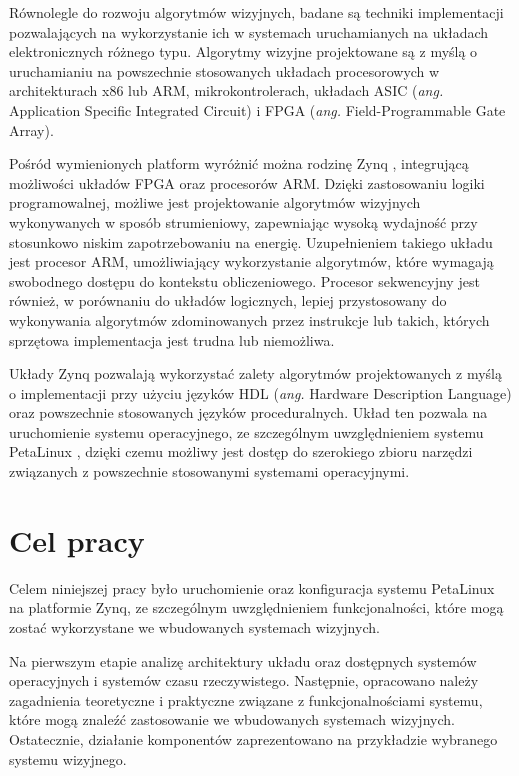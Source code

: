 Równolegle do rozwoju algorytmów wizyjnych, badane są techniki implementacji pozwalających na wykorzystanie ich w systemach uruchamianych na układach elektronicznych różnego typu. %
Algorytmy wizyjne projektowane są z myślą o uruchamianiu na powszechnie stosowanych układach procesorowych w architekturach x86 lub ARM, mikrokontrolerach, układach ASIC (\emph{ang.} Application Specific Integrated Circuit) i FPGA (\emph{ang.} Field-Programmable Gate Array). %

Pośród wymienionych platform wyróżnić można rodzinę Zynq \cite{zybo-reference-manual}, integrującą możliwości układów FPGA oraz procesorów ARM. 
Dzięki zastosowaniu logiki programowalnej, możliwe jest projektowanie algorytmów wizyjnych wykonywanych w sposób strumieniowy, zapewniając wysoką wydajność przy stosunkowo niskim zapotrzebowaniu na energię. %
Uzupełnieniem takiego układu jest procesor ARM, umożliwiający wykorzystanie algorytmów, które wymagają swobodnego dostępu do kontekstu obliczeniowego. Procesor sekwencyjny jest również, w porównaniu do układów logicznych, lepiej przystosowany do wykonywania algorytmów zdominowanych przez instrukcje lub takich, których sprzętowa implementacja jest trudna lub niemożliwa.%

Układy Zynq pozwalają wykorzystać zalety algorytmów projektowanych z myślą o implementacji przy użyciu języków HDL (\emph{ang.} Hardware Description Language) oraz powszechnie stosowanych języków proceduralnych. 
Układ ten pozwala na uruchomienie systemu operacyjnego, ze szczególnym uwzględnieniem systemu PetaLinux \cite{petalinux-tools}, dzięki czemu możliwy jest dostęp do szerokiego zbioru narzędzi związanych z powszechnie stosowanymi systemami operacyjnymi.

\section{Cel pracy}

Celem niniejszej pracy było uruchomienie oraz konfiguracja systemu PetaLinux na platformie Zynq, ze szczególnym uwzględnieniem funkcjonalności, które mogą zostać wykorzystane we wbudowanych systemach wizyjnych. %

Na pierwszym etapie analizę architektury układu oraz dostępnych systemów operacyjnych i systemów czasu rzeczywistego. %
Następnie, opracowano należy zagadnienia teoretyczne i praktyczne związane z funkcjonalnościami systemu, które mogą znaleźć zastosowanie we wbudowanych systemach wizyjnych. %
Ostatecznie, działanie komponentów zaprezentowano na przykładzie wybranego systemu wizyjnego. %

